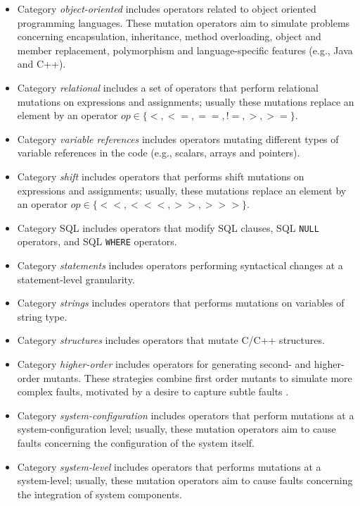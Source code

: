 \begin{itemize}
\item Category \emph{object-oriented} includes operators related to object oriented programming languages. These mutation operators aim to simulate problems concerning encapsulation, inheritance, method overloading, object and member replacement, polymorphism and language-specific features (e.g., Java and C++).
\item Category \emph{relational} includes a set of operators that perform relational mutations on expressions and assignments; usually these mutations replace an element by an operator $op \in \{<, <=, ==, !=, >, >=\}$.
\item Category \emph{variable references} includes operators mutating different types of variable references in the code (e.g., scalars, arrays and pointers).
\item Category \emph{shift} includes operators that performs shift mutations on expressions and assignments; usually, these mutations replace an element by an operator $op \in \{<<, <<<, >>, >>>\}$.
\item Category SQL includes operators that modify SQL clauses, SQL \texttt{NULL} operators, and SQL \texttt{WHERE} operators.
\item Category \emph{statements} includes operators performing syntactical changes at a statement-level granularity.
\item Category \emph{strings} includes operators that performs mutations on variables of string type.
\item Category \emph{structures} includes operators that mutate C/C++ structures.
\item Category \emph{higher-order} includes operators for generating second- and higher-order mutants. These strategies combine first order mutants to simulate more complex faults, motivated by a desire to capture subtle faults \cite{jia2009higher}. 
\item Category \emph{system-configuration} includes operators that perform mutations at a system-configuration level; usually, these mutation operators aim to cause faults concerning the configuration of the system itself.
\item Category \emph{system-level} includes operators that performs mutations at a system-level; usually, these mutation operators aim to cause faults concerning the integration of system components. 

\end{itemize}
